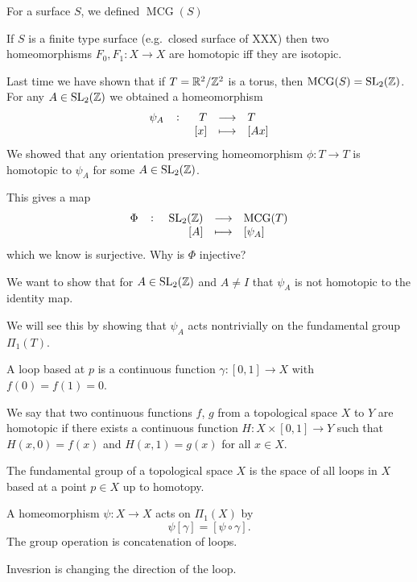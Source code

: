 \documentclass[11pt,a4paper]{article}
\DeclareMathOperator{\MCG}{MCG}
\begin{document}
For a surface $S$, we defined $\MCG(S)$

\begin{theorem}
  If $S$ is a finite type surface (e.g.\ closed surface of XXX)
  then two homeomorphisms $F_0, F_1 \colon X \to X$ are homotopic
  iff they are isotopic.
\end{theorem}

Last time we have shown that if $T = \mathbb{R}^2 / \mathbb{Z}^2$ is a torus,
then $\MCG(S) = \SL_2(\Z)$.
For any $A \in \mathrm{SL}_2(\mathbb{Z})$ we obtained a homeomorphism
\[
  \fullfunction{\psi_A}{T}{T}{[x]}{[Ax]}
\]
We showed that any orientation preserving homeomorphism $\phi \colon T \to T$
is homotopic to $\psi_A$ for some $A \in \mathrm{SL}_2(\mathbb{Z})$.

This gives a map
\[
  \fullfunction{\Phi}{\SL_2(\Z)}{\MCG(T)}{[A]}{[\psi_A]}
\]
which we know is surjective.
Why is $\Phi$ injective?


We want to show that for $A \in \mathrm{SL}_2(\mathbb{Z})$ and $A \neq I$ that $\psi_A$
is not homotopic to the identity map.

We will see this by showing that $\psi_A$ acts nontrivially on the fundamental
group $\Pi_1(T)$.

\begin{definition}[Loop]
  A loop based at $p$ is a continuous function $\gamma \colon [0,1] \to X$ with 
  $f(0) = f(1) = 0$.
\end{definition}

\begin{definition}[Homotopy]
  We say that two continuous functions $f$, $g$ from a topological space $X$
  to $Y$ are homotopic if there exists a continuous function 
  $H \colon X \times [0,1] \to Y$ such that $H(x,0) = f(x)$ and
  $H(x,1) = g(x)$ for all $x \in X$.
\end{definition}

\begin{definition}
  The fundamental group of a topological space $X$ is the space of all loops
  in $X$ based at a point $p \in X$ up to homotopy.
\end{definition}
 
A homeomorphism $\psi \colon X \to X$ acts on $\Pi_1(X)$ by
\[
  \psi[\gamma] = [\psi \circ \gamma].
\]
The group operation is concatenation of loops.

Invesrion is changing the direction of the loop.
\end{document}
